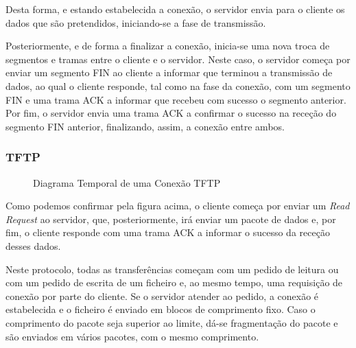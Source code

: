 \documentclass[11pt]{article}
\begin{document}
Desta forma, e estando estabelecida a conexão, o servidor envia para o cliente os dados que são pretendidos, iniciando-se a fase de transmissão.

Posteriormente, e de forma a finalizar a conexão, inicia-se uma nova troca de segmentos e tramas entre o cliente e o servidor. Neste caso, o servidor começa por enviar um segmento FIN ao cliente a informar que terminou a transmissão de dados, ao qual o cliente responde, tal como na fase da conexão, com um segmento FIN e uma trama ACK a informar que recebeu com sucesso o segmento anterior. Por fim, o servidor envia uma trama ACK a confirmar o sucesso na receção do segmento FIN anterior, finalizando, assim, a conexão entre ambos.

\subsubsection{TFTP}

\begin{figure}[hbt!]
    \centering
    \caption{Diagrama Temporal de uma Conexão TFTP}
\end{figure}

Como podemos confirmar pela figura acima, o cliente começa por enviar um  \textit{Read Request} ao servidor, que, posteriormente, irá enviar um pacote de dados e, por fim, o cliente responde com uma trama ACK a informar o sucesso da receção desses dados.

Neste protocolo, todas as transferências começam com um pedido de leitura ou com um pedido de escrita de um ficheiro e, ao mesmo tempo, uma requisição de conexão por parte do cliente. Se o servidor atender ao pedido, a conexão é estabelecida e o ficheiro é enviado em blocos de comprimento fixo. Caso o comprimento do pacote seja superior ao limite, dá-se fragmentação do pacote e são enviados em vários pacotes, com o mesmo comprimento.


\clearpage
\end{document}

